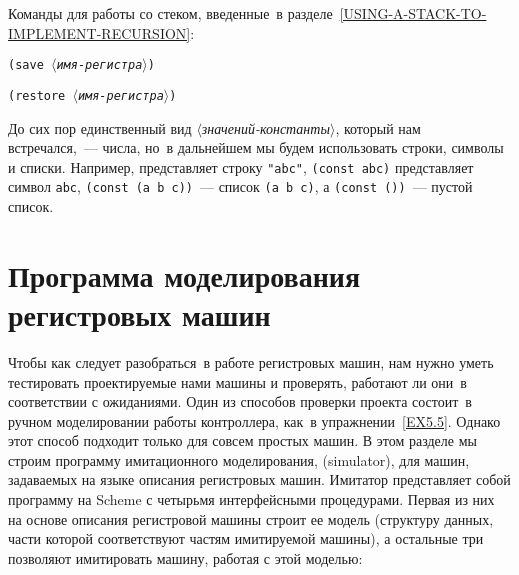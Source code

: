 Команды для работы со стеком, введенные~в 
разделе~\ref{USING-A-STACK-TO-IMPLEMENT-RECURSION}:

\begin{plainlist}
\item {\tt(save \textit{$\langle$имя-регистра$\rangle$})} 

\item {\tt (restore \textit{$\langle$имя-регистра$\rangle$})} 
\end{plainlist}

До сих пор единственный вид
\textit{$\langle$значений-константы$\rangle$}, который нам встречался,~--- числа,
но~в дальнейшем мы будем использовать строки, символы и списки.
Например,   представляет строку
{\tt "abc"{\em }}, {\tt (const abc)} представляет символ {\tt abc},
{\tt (const (a b c))}~--- список {\tt (a b c)}, а
{\tt (const ())}~--- пустой список.

\section{Программа моделирования регистровых машин}
\label{A-REGISTER-MACHINE-SIMULATOR}

Чтобы как следует разобраться~в работе регистровых
машин, нам нужно уметь тестировать проектируемые нами машины и
проверять, работают ли они~в соответствии с ожиданиями.  Один из
способов проверки проекта состоит~в ручном моделировании работы
контроллера, как~в упражнении~\ref{EX5.5}.  Однако этот
способ подходит только для совсем простых машин.  В этом разделе мы
строим программу имитационного моделирования, 
 (simulator), для машин, задаваемых на
языке описания регистровых машин.  Имитатор представляет собой
программу на Scheme с четырьмя интерфейсными процедурами.  Первая из
них на основе описания регистровой машины строит ее модель (структуру
данных, части которой соответствуют частям имитируемой машины), а
остальные три позволяют имитировать машину, работая с этой
моделью:

